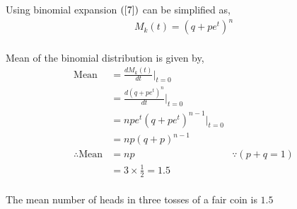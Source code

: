 \documentclass[journal,12pt,twocolumn]{IEEEtran}
\begin{document}
Using binomial expansion $(\ref{7})$ can be simplified as,
\begin{align}
M_k(t)= (q + pe^t)^n
\end{align}
\\

Mean of the binomial distribution is given by,
\begin{align}
\text{Mean}&= \frac{dM_k(t)}{dt}|_{t=0}&
\\
&= \frac{d(q + pe^t)^n}{dt}|_{t=0}&
\\
&=npe^t(q + pe^t)^{n-1}|_{t=0}&
\\
&= np(q + p)^{n-1}&
\\
\therefore \text{Mean} &= np& {}\because(p+q=1)
\\
&= 3\times\frac{1}{2}= 1.5&
\end{align}
\\

The mean number of heads in three tosses of a fair coin is $1.5$
\end{document}
